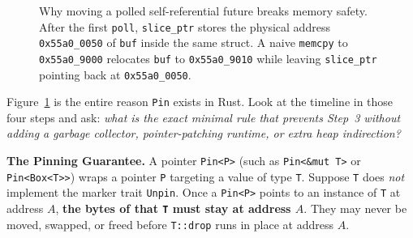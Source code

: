 \begin{figure}[H]
\caption{Why moving a polled self-referential future breaks memory safety. After the first \texttt{poll}, \texttt{slice\_ptr} stores the physical address \texttt{0x55a0\_0050} of \texttt{buf} inside the same struct. A naive \texttt{memcpy} to \texttt{0x55a0\_9000} relocates \texttt{buf} to \texttt{0x55a0\_9010} while leaving \texttt{slice\_ptr} pointing back at \texttt{0x55a0\_0050}.}
\label{ch12:fig-self-ref-pin}
\end{figure}

Figure~\ref{ch12:fig-self-ref-pin} is the entire reason \texttt{Pin} exists in Rust. Look at the timeline in those four steps and ask: \emph{what is the exact minimal rule that prevents Step~3 without adding a garbage collector, pointer-patching runtime, or extra heap indirection?}

\begin{formalbox}
\textbf{The Pinning Guarantee.} A pointer \texttt{Pin<P>} (such as \texttt{Pin<\&mut T>} or \texttt{Pin<Box<T>>}) wraps a pointer \texttt{P} targeting a value of type \texttt{T}. Suppose \texttt{T} does \emph{not} implement the marker trait \texttt{Unpin}. Once a \texttt{Pin<P>} points to an instance of \texttt{T} at address $A$, \textbf{the bytes of that \texttt{T} must stay at address $A$}. They may never be moved, swapped, or freed before \texttt{T::drop} runs in place at address $A$.
\end{formalbox}


